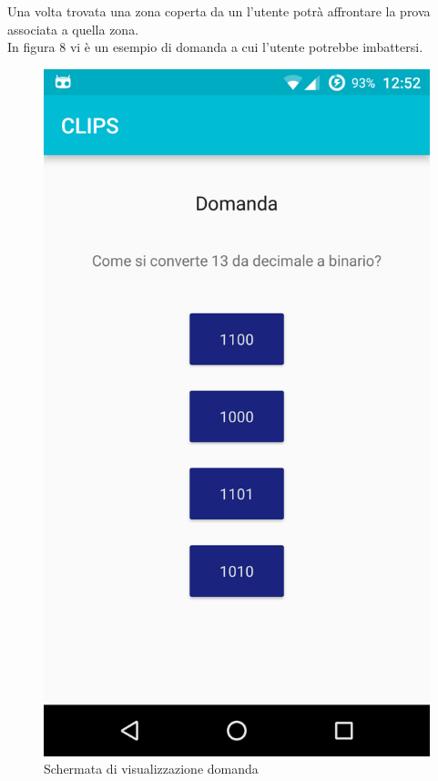Una volta trovata una zona coperta da un  l'utente potrà affrontare la prova associata a quella zona. \\
In figura 8 vi è un esempio di domanda a cui l'utente potrebbe imbattersi.

\begin{figure}[!h]
	\centering
	\includegraphics[scale=0.15]{screenshot/domanda}
	\caption{Schermata di visualizzazione domanda}
\end{figure}

